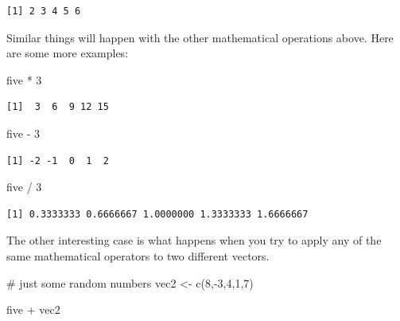 \documentclass[
  letterpaper,
  DIV=11,
  numbers=noendperiod]{scrreprt}
\newenvironment{Shaded}{\begin{snugshade}}{\end{snugshade}}
\newcommand{\CommentTok}[1]{\textcolor[rgb]{0.37,0.37,0.37}{#1}}
\newcommand{\DecValTok}[1]{\textcolor[rgb]{0.68,0.00,0.00}{#1}}
\newcommand{\FunctionTok}[1]{\textcolor[rgb]{0.28,0.35,0.67}{#1}}
\newcommand{\NormalTok}[1]{\textcolor[rgb]{0.00,0.23,0.31}{#1}}
\newcommand{\OtherTok}[1]{\textcolor[rgb]{0.00,0.23,0.31}{#1}}
\newcommand{\SpecialCharTok}[1]{\textcolor[rgb]{0.37,0.37,0.37}{#1}}
\begin{document}
\begin{verbatim}
[1] 2 3 4 5 6
\end{verbatim}

Similar things will happen with the other mathematical operations above.
Here are some more examples:

\begin{Shaded}
\begin{Highlighting}[]
\NormalTok{five }\SpecialCharTok{*} \DecValTok{3}
\end{Highlighting}
\end{Shaded}

\begin{verbatim}
[1]  3  6  9 12 15
\end{verbatim}

\begin{Shaded}
\begin{Highlighting}[]
\NormalTok{five }\SpecialCharTok{{-}} \DecValTok{3}
\end{Highlighting}
\end{Shaded}

\begin{verbatim}
[1] -2 -1  0  1  2
\end{verbatim}

\begin{Shaded}
\begin{Highlighting}[]
\NormalTok{five }\SpecialCharTok{/} \DecValTok{3}
\end{Highlighting}
\end{Shaded}

\begin{verbatim}
[1] 0.3333333 0.6666667 1.0000000 1.3333333 1.6666667
\end{verbatim}

The other interesting case is what happens when you try to apply any of
the same mathematical operators to two different vectors.

\begin{Shaded}
\begin{Highlighting}[]
\CommentTok{\# just some random numbers}
\NormalTok{vec2 }\OtherTok{\textless{}{-}} \FunctionTok{c}\NormalTok{(}\DecValTok{8}\NormalTok{,}\SpecialCharTok{{-}}\DecValTok{3}\NormalTok{,}\DecValTok{4}\NormalTok{,}\DecValTok{1}\NormalTok{,}\DecValTok{7}\NormalTok{)}

\NormalTok{five }\SpecialCharTok{+}\NormalTok{ vec2}
\end{Highlighting}
\end{Shaded}
\end{document}

